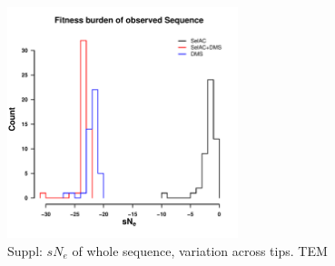 \documentclass[12pt]{article}
\begin{document}
\begin{figure}[H]
     \centering
	\includegraphics[width=0.6\textwidth]{img/sNe_TEM2016.pdf}
	\caption{Suppl: $sN_e$ of whole sequence, variation across tips. TEM}
	\label{fig:gl_TEM}
\end{figure}
\end{document}
